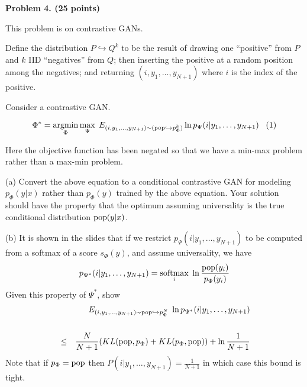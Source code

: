 \documentclass{article}
\newcommand{\solution}[1]{}
\begin{document}
\bigskip
{\bf Problem 4. (25 points)}

This problem is on contrastive GANs.

Define the distribution $P\hookrightarrow Q^k$ to be the result of drawing one ``positive'' from $P$ and $k$ IID ``negatives'' from $Q$;
then inserting the positive at a random position among the negatives; and returning $(i,y_1,\ldots,y_{N+1})$ where
$i$ is the index of the positive.

Consider a contrastive GAN.

$$\Phi^* = \operatorname*{argmin}_\Phi \max_\Psi \;E_{(i,y_1,\ldots,y_{N+1}) \sim (\mathrm{pop} \hookrightarrow p_\Phi^k)} \ln p_\Psi(i|y_1,\ldots,y_{N+1}) \;\;\;(1)$$

Here the objective function has been negated so that we have a min-max
problem rather than a max-min problem.

\medskip
(a) Convert the above equation to a conditional contrastive GAN for modeling $p_\Phi(y|x)$ rather than $p_\Phi(y)$ trained by the above equation.
Your solution should have the property that the optimum assuming universality is the true conditional distribution $\mathrm{pop}(y|x)$.

\solution{
  $$\Phi^* = \argmin_\Phi \max_\Psi E_{x \sim \popd} \; \;E_{(i,y_1,\ldots,y_{N+1}) \sim (\popd(y|x) \hookrightarrow p_\Phi(y|x)^k)} \ln p_\Psi(i|y_1,\ldots,y_{N+1},x)$$
}

\medskip
(b) It is shown in the slides that if we restrict $p_\Psi(i|y_1,\ldots,y_{N+1})$ to be
computed from a softmax of a score $s_\Phi(y)$, and assume universality, we have
$$p_{\Psi^*}(i|y_1,\ldots,y_{N+1}) = \operatorname*{softmax}_i \;\ln \frac{\mathrm{pop}(y_i)}{p_\Phi(y_i)}$$
Given this property of $\Psi^*$, show
\begin{eqnarray*}
  && E_{(i,y_1,\dots,y_{N+1}) \sim \mathrm{pop}\hookrightarrow p_\Phi^N}\;\ln p_{\Psi^*}(i|y_1,\ldots,y_{N+1}) \\
  \\
  & \leq & \frac{N}{N+1}(KL(\mathrm{pop},p_\Phi) + KL(p_\Phi,\mathrm{pop})) + \ln \frac{1}{N+1}
\end{eqnarray*}
Note that if $p_\Phi = \mathrm{pop}$ then $P(i|y_1,\ldots,y_{N+1}) = \frac{1}{N+1}$ in which case this bound is tight.
\end{document}
